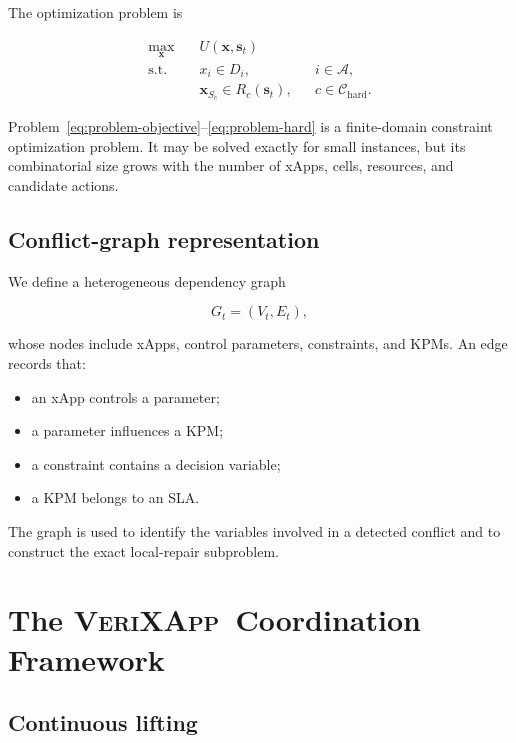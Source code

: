 \documentclass[pdflatex,sn-mathphys-num,iicol,oneside]{sn-jnl}
\newcommand{\method}{\textsc{VeriXApp}}
\begin{document}
The optimization problem is

\begin{align}
\max_{\bm{x}}\quad&
U(\bm{x},\bm{s}_t)
\label{eq:problem-objective}\\
\text{s.t.}\quad&
x_i\in D_i,
&& i\in\mathcal{A},
\label{eq:problem-domain}\\
&
\bm{x}_{S_c}\in R_c(\bm{s}_t),
&& c\in\mathcal{C}_{\mathrm{hard}}.
\label{eq:problem-hard}
\end{align}

Problem~\eqref{eq:problem-objective}--\eqref{eq:problem-hard} is a
finite-domain constraint optimization problem. It may be solved
exactly for small instances, but its combinatorial size grows with
the number of xApps, cells, resources, and candidate actions.

\subsection{Conflict-graph representation}

We define a heterogeneous dependency graph

\begin{equation}
G_t=(V_t,E_t),
\end{equation}

whose nodes include xApps, control parameters, constraints, and KPMs.
An edge records that:

\begin{itemize}
    \item an xApp controls a parameter;
    \item a parameter influences a KPM;
    \item a constraint contains a decision variable;
    \item a KPM belongs to an SLA.
\end{itemize}

The graph is used to identify the variables involved in a detected
conflict and to construct the exact local-repair subproblem.

\section{The \method\ Coordination Framework}
\label{sec:method}

\subsection{Continuous lifting}
\end{document}
